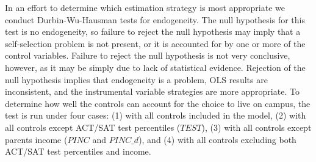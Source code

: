 \documentclass[12pt]{article}
\begin{document}

In an effort to determine which estimation strategy is most appropriate we conduct Durbin-Wu-Hausman tests for endogeneity.  The null hypothesis for this test is no endogeneity, so failure to reject the null hypothesis may imply that a self-selection problem is not present, or it is accounted for by one or more of the control variables.  Failure to reject the null hypothesis is not very conclusive, however, as it may be simply due to lack of statistical evidence.  Rejection of the null hypothesis implies that endogeneity is a problem, OLS results are inconsistent, and the instrumental variable strategies are more appropriate.  To determine how well the controls can account for the choice to live on campus, the test is run under four cases: (1) with all controls included in the model, (2) with all controls except ACT/SAT test percentiles ($TEST$), (3) with all controls except parents income ($PINC$ and $PINC\_d$), and (4) with all controls excluding both ACT/SAT test percentiles and income. 
\end{document}
